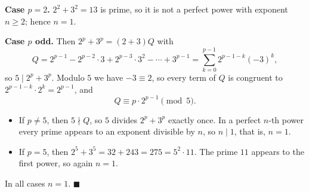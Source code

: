 \textbf{Case $p=2$.} $2^2+3^2=13$ is prime, so it is not a perfect power with exponent $n\ge2$; hence $n=1$.

\textbf{Case $p$ odd.} Then $2^p+3^p=(2+3)Q$ with
\[
Q=2^{p-1}-2^{p-2}\cdot3+2^{p-3}\cdot3^2-\cdots+3^{p-1}=\sum_{k=0}^{p-1}2^{p-1-k}(-3)^k,
\]
so $5\mid2^p+3^p$. Modulo $5$ we have $-3\equiv2$, so every term of $Q$ is congruent to $2^{p-1-k}\cdot2^k=2^{p-1}$, and
\[
Q\equiv p\cdot2^{p-1}\pmod5 .
\]
\begin{itemize}
\item If $p\neq5$, then $5\nmid Q$, so $5$ divides $2^p+3^p$ exactly once. In a perfect $n$-th power every prime appears to an exponent divisible by $n$, so $n\mid1$, that is, $n=1$.
\item If $p=5$, then $2^5+3^5=32+243=275=5^2\cdot11$. The prime $11$ appears to the first power, so again $n=1$.
\end{itemize}
In all cases $n=1$. $\blacksquare$
